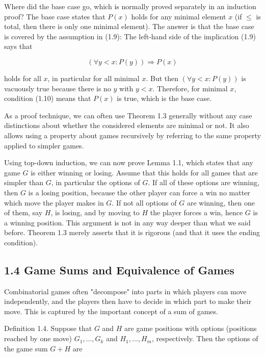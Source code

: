 \documentclass[12pt]{article}
\begin{document}
Where did the base case go, which is normally proved separately in an induction proof? The base case states that $P(x)$ holds for any minimal element $x$ (if $\leq$ is total, then there is only one minimal element). The answer is that the base case is covered by the assumption in (1.9): The left-hand side of the implication (1.9) says that


\begin{equation*}
(\forall y<x: P(y)) \Rightarrow P(x) \tag{1.10}
\end{equation*}


holds for all $x$, in particular for all minimal $x$. But then $(\forall y<x: P(y))$ is vacuously true because there is no $y$ with $y<x$. Therefore, for minimal $x$, condition (1.10) means that $P(x)$ is true, which is the base case.

As a proof technique, we can often use Theorem 1.3 generally without any case distinctions about whether the considered elements are minimal or not. It also allows using a property about games recursively by referring to the same property applied to simpler games.

Using top-down induction, we can now prove Lemma 1.1, which states that any game $G$ is either winning or losing. Assume that this holds for all games that are simpler than $G$, in particular the options of $G$. If all of these options are winning, then $G$ is a losing position, because the other player can force a win no matter which move the player makes in $G$. If not all options of $G$ are winning, then one of them, say $H$, is losing, and by moving to $H$ the player forces a win, hence $G$ is a winning position. This argument is not in any way deeper than what we said before. Theorem 1.3 merely asserts that it is rigorous (and that it uses the ending condition).

\subsection*{1.4 Game Sums and Equivalence of Games}
Combinatorial games often "decompose" into parts in which players can move independently, and the players then have to decide in which part to make their move. This is captured by the important concept of a sum of games.

Definition 1.4. Suppose that $G$ and $H$ are game positions with options (positions reached by one move) $G_{1}, \ldots, G_{k}$ and $H_{1}, \ldots, H_{m}$, respectively. Then the options of the game sum $G+H$ are
\end{document}

